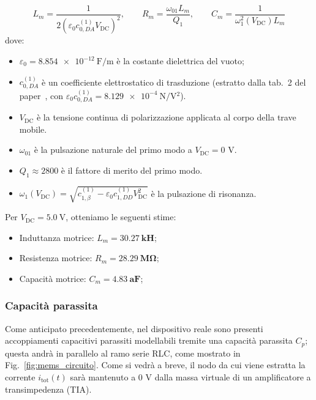 \documentclass[11pt,a4paper]{article}
\begin{document}
\begin{equation}
    L_m = \frac{1}{2\left(\varepsilon_0 c_{0,DA}^{(1)} V_{\text{DC}}\right)^2}, \qquad
    R_m = \frac{\omega_{01} L_m}{Q_1}, \qquad
    C_m = \frac{1}{\omega_1^2(V_{\text{DC}}) L_m}
\end{equation}
dove:
\begin{itemize}
    \item $\varepsilon_0 = \SI{8.854e-12}{\farad/\meter}$ è la costante dielettrica del vuoto;
    \item $c_{0,DA}^{(1)}$ è un coefficiente elettrostatico di trasduzione (estratto dalla tab.~2 del paper~\cite{frangi2023}, con $\varepsilon_0 c_{0,DA}^{(1)} = \SI{8.129e-4}{\newton/\volt^2}$).
    \item $V_{\text{DC}}$ è la tensione continua di polarizzazione applicata al corpo della trave mobile.
    \item $\omega_{01}$ è la pulsazione naturale del primo modo a $V_{\text{DC}} = 0\text{ V}$.
    \item $Q_1 \approx 2800$ è il fattore di merito del primo modo.
    \item $\omega_1(V_{\text{DC}}) = \sqrt{c_{1,\beta}^{(1)} - \varepsilon_0 c_{1,DD}^{(1)} V_{\text{DC}}^2}$ è la pulsazione di risonanza.
\end{itemize}
Per $V_{\text{DC}} = \SI{5.0}{\volt}$, otteniamo le seguenti stime:
\begin{itemize}
    \item Induttanza motrice: $L_m = \mathbf{\SI{30.27}{\kilo\henry}}$;
    \item Resistenza motrice: $R_m = \mathbf{\SI{28.29}{\mega\ohm}}$;
    \item Capacità motrice: $C_m = \mathbf{\SI{4.83}{\atto\farad}}$;
\end{itemize}
\subsubsection{Capacità parassita}
Come anticipato precedentemente, nel dispositivo reale sono presenti accoppiamenti capacitivi parassiti modellabili tremite una capacità parassita $C_p$; questa andrà in parallelo al ramo serie RLC, come mostrato in Fig.~\ref{fig:mems_circuito}. Come si vedrà a breve, il nodo da cui viene estratta la corrente $i_{\text{tot}}(t)$ sarà mantenuto a $0\text{ V}$ dalla massa virtuale di un amplificatore a transimpedenza (TIA).
\end{document}
